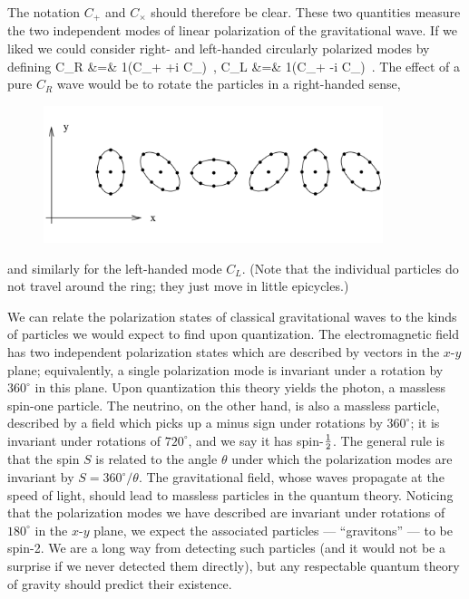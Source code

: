 \documentclass[12pt]{article}
\begin{document}
\noindent The notation $C_+$ and $C_\times$ should therefore be
clear.  These two quantities measure the two independent modes
of linear polarization of the gravitational wave.  If we liked
we could consider right- and left-handed circularly polarized 
modes by defining
\bea
  C_R &=&  {1}(C_+ +i C_\times)\ ,\cr
  C_L &=&  {1}(C_+ -i C_\times)\ . \label{6.69}
\eea
The effect of a pure $C_R$ wave would be to rotate the particles
in a right-handed sense,

\begin{figure}[h]
  \centerline{
  \includegraphics[height=4cm]{pdf/six5}}
\end{figure}

\noindent and similarly for the left-handed mode $C_L$.  (Note
that the individual particles do not travel around the ring; they
just move in little epicycles.)

We can relate the polarization states of classical gravitational waves
to the kinds of particles we would expect to find upon 
quantization.  The electromagnetic field has two independent
polarization states which are described by vectors in
the $x$-$y$ plane; equivalently, a single polarization mode
is invariant under a rotation by $360^\circ$ in this plane.
Upon quantization this theory yields the photon, a massless
spin-one particle.  The neutrino, on the other hand, is also a 
massless particle, described by a field which picks up a
minus sign under rotations by $360^\circ$; it is invariant 
under rotations of $720^\circ$, and we say it has 
spin-${1\over 2}$.  The general rule is that the spin $S$ is
related to the angle $\theta$ under which the polarization modes
are invariant by $S=360^\circ/\theta$.
The gravitational field, whose waves
propagate at the speed of light, should lead to massless particles
in the quantum theory.  Noticing that the polarization modes we
have described are invariant under rotations of $180^\circ$ in
the $x$-$y$ plane, we expect the associated particles
--- ``gravitons'' --- to be
spin-2.  We are a long way from detecting such particles (and it
would not be a surprise if we never detected them directly), but any
respectable quantum theory of gravity should predict their existence.
\end{document}
